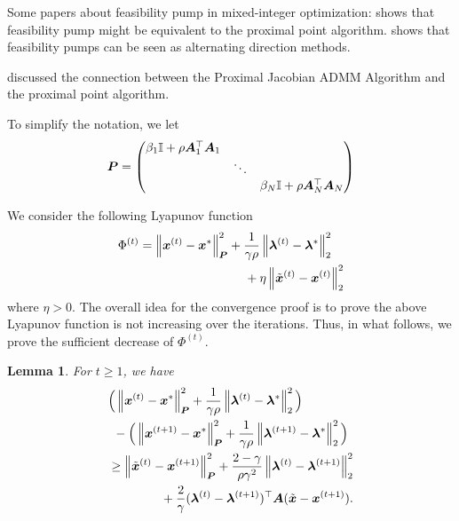 \documentclass[twocolumn,amsthm]{autart}%
\theoremstyle{definition}
\theoremstyle{plain}
\newtheorem{lemma}{Lemma}
\begin{document}
Some papers about feasibility pump in mixed-integer optimization: \cite{boland2012new} shows that feasibility pump might be equivalent to the proximal point algorithm.
\cite{geissler2017penalty} shows that feasibility pumps can be seen as alternating direction methods.

\cite[Section V]{deng2017parallel} discussed the connection between the Proximal Jacobian ADMM Algorithm and the proximal point algorithm.


To simplify the notation, we let
\begin{equation}
\boldsymbol{P} = 
\begin{pmatrix}
\beta_1 \mathbb{I} + \rho \boldsymbol{A}_1^\top \boldsymbol{A}_1 \\
& \ddots \\
& & \beta_N \mathbb{I} + \rho \boldsymbol{A}_N^\top \boldsymbol{A}_N
\end{pmatrix}
\end{equation}

We consider the following Lyapunov function
\begin{equation}
\label{eq:Lya-fcn}
\begin{multlined}
\Phi^{(t)} = \norm{\bbsym{x}^{(t)}-\bbsym{x}^{*}}^2_{\bbsym{P}}
+ \frac{1}{\gamma \rho} \norm{\bbsym{\lambda}^{(t)}-\bbsym{\lambda}^{*}}_2^2 \\
+ \eta \norm{\xtil^{(t)} - \bbsym{x}^{(t)}}_2^2
\end{multlined}
\end{equation}
where $\eta > 0$.
The overall idea for the convergence proof is to prove the above Lyapunov function is not increasing over the iterations.
Thus, in what follows, we prove the sufficient decrease of $\Phi^{(t)}$.

\begin{lemma}
\label{lem:first-ineq}
For $t \ge 1$, we have
\begin{equation}
\label{eq:lem1a}
\begin{multlined}
\Big( \norm{\bbsym{x}^{(t)}-\bbsym{x}^{*}}^2_{\bbsym{P}}
+ \frac{1}{\gamma \rho} \norm{\bbsym{\lambda}^{(t)}-\bbsym{\lambda}^{*}}_2^2 \Big) \\
- \Big(\norm{\bbsym{x}^{(t+1)}-\bbsym{x}^{*}}^2_{\bbsym{P}}
+ \frac{1}{\gamma \rho} \norm{\bbsym{\lambda}^{(t+1)}-\bbsym{\lambda}^{*}}_2^2 \Big) \\
\ge \norm{\xtil^{(t)}-\bbsym{x}^{(t+1)}}_{\bbsym{P}}^2
+ \frac{2-\gamma}{\rho \gamma^2} \norm{\bbsym{\lambda}^{(t)}-\bbsym{\lambda}^{(t+1)}}_2^2 \\
+ \frac{2}{\gamma} (\bbsym{\lambda}^{(t)}-\bbsym{\lambda}^{(t+1)})^\top \bbsym{A} (\xtil-\bbsym{x}^{(t+1)}).
\end{multlined}
\end{equation}
\end{lemma}
\end{document}
